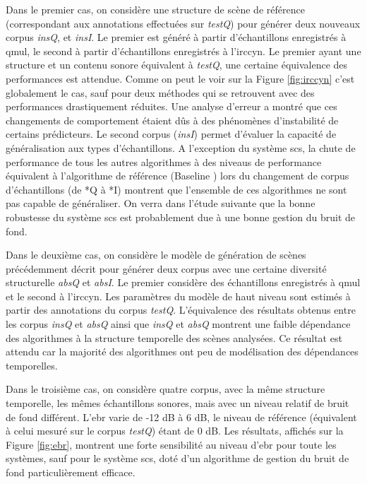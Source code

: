Dans le premier cas, on considère une structure de scène de référence (correspondant aux annotations effectuées sur \emph{testQ}) pour générer deux nouveaux corpus \emph{insQ}, et \emph{insI}. Le premier est généré à partir d'échantillons enregistrés à qmul, le second à partir d'échantillons enregistrés à l'irccyn. Le premier ayant une structure et un contenu sonore équivalent à \emph{testQ}, une certaine équivalence des performances est attendue. Comme on peut le voir sur la Figure \ref{fig:irccyn} c'est globalement le cas, sauf pour deux méthodes qui se retrouvent avec des performances drastiquement réduites. Une analyse d'erreur a montré que ces changements de comportement étaient dûs à des phénomènes d'instabilité de certains prédicteurs. Le second corpus (\emph{insI}) permet d'évaluer la capacité de généralisation aux types d'échantillons. A l'exception du système scs, la chute de performance de tous les autres algorithmes à des niveaus de performance équivalent à l'algorithme de référence (\og Baseline \fg) lors du changement de corpus d'échantillons (de *Q à *I) montrent que l'ensemble de ces algorithmes ne sont pas capable de généraliser. On verra dans l'étude suivante que la bonne robustesse du système scs est probablement due à une bonne gestion du bruit de fond.

Dans le deuxième cas, on considère le modèle de génération de scènes précédemment décrit pour générer deux corpus avec une certaine diversité structurelle \emph{absQ} et \emph{absI}. Le premier considère des échantillons enregistrés à qmul et le second à l'irccyn. Les paramètres du modèle de haut niveau sont estimés à partir des annotations du corpus \emph{testQ}. L'équivalence des résultats obtenus entre les corpus \emph{insQ} et \emph{absQ} ainsi que \emph{insQ} et \emph{absQ} montrent une faible dépendance des algorithmes à la structure temporelle des scènes analysées. Ce résultat est attendu car la majorité des algorithmes ont peu de modélisation des dépendances temporelles.

Dans le troisième cas, on considère quatre corpus, avec la même structure temporelle, les mêmes échantillons sonores, mais avec un niveau relatif de bruit de fond différent. L'ebr varie de -12 dB à 6 dB, le niveau de référence (équivalent à celui mesuré sur le corpus \emph{testQ})  étant de 0 dB. Les résultats, affichés sur la Figure \ref{fig:ebr}, montrent une forte sensibilité au niveau d'ebr pour toute les systèmes, sauf pour le système scs, doté d'un algorithme de gestion du bruit de fond particulièrement efficace.~\cite{lafayhal-01111381}

